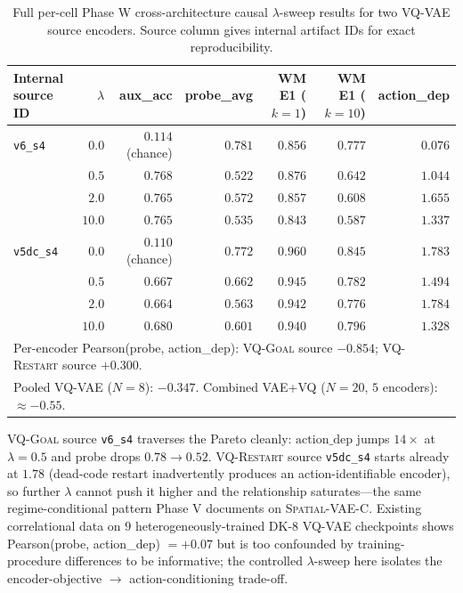 \documentclass{article}
\newcommand{\encVQRestart}{\textsc{VQ-Restart}}
\newcommand{\encVQGoal}{\textsc{VQ-Goal}}
\newcommand{\srcVC}{\textsc{Spatial-VAE-C}}
\begin{document}
\begin{table}[h]
  \centering
  \small
  \caption{Full per-cell Phase W cross-architecture causal $\lambda$-sweep results for two VQ-VAE source encoders. Source column gives internal artifact IDs for exact reproducibility.}
  \label{tab:phase-w-full}
  \begin{tabular}{l r r r r r r}
    \toprule
    Internal source ID & $\lambda$ & aux\_acc & probe\_avg & WM E1 ($k{=}1$) & WM E1 ($k{=}10$) & action\_dep \\
    \midrule
    \texttt{v6\_s4}   & $0.0$  & $0.114$ (chance) & $\mathbf{0.781}$ & $0.856$ & $0.777$ & $\mathbf{0.076}$ \\
    & $0.5$  & $0.768$ & $0.522$ & $0.876$ & $0.642$ & $1.044$ \\
    & $2.0$  & $0.765$ & $0.572$ & $0.857$ & $0.608$ & $1.655$ \\
    & $10.0$ & $0.765$ & $0.535$ & $0.843$ & $0.587$ & $1.337$ \\
    \midrule
    \texttt{v5dc\_s4} & $0.0$  & $0.110$ (chance) & $0.772$ & $0.960$ & $0.845$ & $1.783$ \\
    & $0.5$  & $0.667$ & $0.662$ & $0.945$ & $0.782$ & $1.494$ \\
    & $2.0$  & $0.664$ & $0.563$ & $0.942$ & $0.776$ & $1.784$ \\
    & $10.0$ & $0.680$ & $0.601$ & $0.940$ & $0.796$ & $1.328$ \\
    \midrule
    \multicolumn{7}{l}{Per-encoder Pearson(probe, action\_dep): \encVQGoal{} source $\mathbf{-0.854}$; \encVQRestart{} source $+0.300$.}\\
    \multicolumn{7}{l}{Pooled VQ-VAE ($N{=}8$): $-0.347$. Combined VAE+VQ ($N{=}20$, $5$ encoders): $\approx -0.55$.}\\
    \bottomrule
  \end{tabular}
\end{table}
\encVQGoal{} source \texttt{v6\_s4} traverses the Pareto cleanly: $\mathrm{action\_dep}$ jumps $14\times$ at $\lambda{=}0.5$ and probe drops $0.78 \to 0.52$. \encVQRestart{} source \texttt{v5dc\_s4} starts already at $1.78$ (dead-code restart inadvertently produces an action-identifiable encoder), so further $\lambda$ cannot push it higher and the relationship saturates---the same regime-conditional pattern Phase V documents on \srcVC{}. Existing correlational data on $9$ heterogeneously-trained DK-8 VQ-VAE checkpoints shows Pearson(probe, action\_dep) $=+0.07$ but is too confounded by training-procedure differences to be informative; the controlled $\lambda$-sweep here isolates the encoder-objective $\to$ action-conditioning trade-off.
\end{document}
